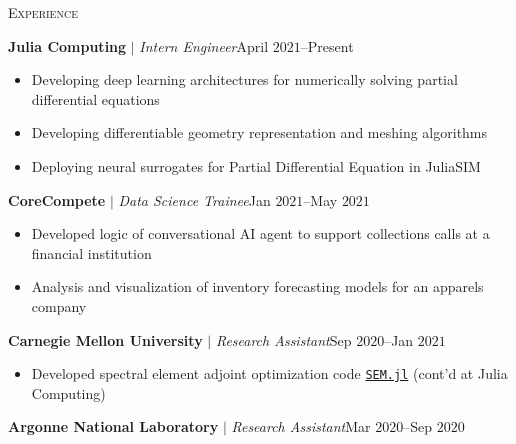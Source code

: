\documentclass[10pt]{article}
\begin{document}
\begin{multicols}{2}
\textsc{Experience}
\columnbreak

\textbf{Julia Computing} $|$ \textit{Intern Engineer}\hfill April $2021$--Present

\vspace{-1.75em}
\begin{itemize}[label=-,leftmargin=1.0em]
    \setlength\itemsep{-0.25em}
    \item Developing deep learning architectures for numerically solving partial differential equations
    \item Developing differentiable geometry representation and meshing algorithms
    \item Deploying neural surrogates for Partial Differential Equation in JuliaSIM
\end{itemize}
\vspace{-2.0em}

\vspace{0.5em}
%
\textbf{CoreCompete} $|$ \textit{Data Science Trainee}\hfill Jan $2021$--May $2021$

\vspace{-1.75em}
\begin{itemize}[label=-,leftmargin=1.0em]
    \setlength\itemsep{-0.25em}
    \item Developed logic of conversational AI agent to support collections calls at a financial institution
    \item Analysis and visualization of inventory forecasting models for an apparels company
\end{itemize}
\vspace{-2.0em}

\vspace{0.5em}
%
\textbf{Carnegie Mellon University} $|$ \textit{Research Assistant}\hfill Sep $2020$--Jan $2021$

\vspace{-1.75em}
\begin{itemize}[label=-,leftmargin=1.0em]
    \setlength\itemsep{-0.25em}
    \item Developed spectral element adjoint optimization code \href{https://github.com/vpuri3/SEM.jl}{\texttt{SEM.jl}} (cont'd at Julia Computing)
\end{itemize}
\vspace{-2.0em}

\vspace{0.5em}
%
\textbf{Argonne National Laboratory} $|$ \textit{Research Assistant}\hfill Mar $2020$--Sep $2020$


\end{multicols}
\end{document}
